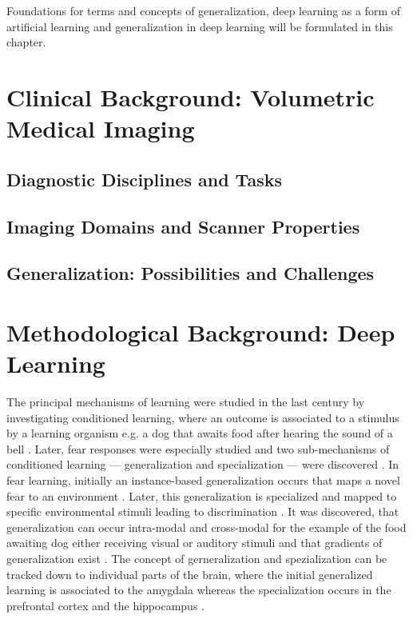 Foundations for terms and concepts of generalization, deep learning as a form of artificial learning and generalization in deep learning will be formulated in this chapter.

\section{Clinical Background: Volumetric Medical Imaging}
    \subsection{Diagnostic Disciplines and Tasks}
    \subsection{Imaging Domains and Scanner Properties}
    \subsection{Generalization: Possibilities and Challenges}

\section{Methodological Background: Deep Learning}

    The principal mechanisms of learning were studied in the last century by investigating conditioned learning, where an outcome is associated to a stimulus by a learning organism e.g. a dog that awaits food after hearing the sound of a bell \citep{pavlov1928conditioned, pavlov2010conditioned, banich2011generalization}. Later, fear responses were especially studied and two sub-mechanisms of conditioned learning --- generalization and specialization --- were discovered \citep{banich2011generalization}.
    In fear learning, initially an instance-based generalization occurs that maps a novel fear to an environment \citep{banich2011generalization}. Later, this generalization is specialized and mapped to specific environmental stimuli leading to discrimination \citep{banich2011generalization}.
    It was discovered, that generalization can occur intra-modal and cross-modal for the example of the food awaiting dog either receiving visual or auditory stimuli \citep{pavlov1928conditioned} and that gradients of generalization exist \citep{guttman1956discriminability}.
    The concept of gerneralization and spezialization can be tracked down to individual parts of the brain, where the initial generalized learning is associated to the amygdala whereas the specialization occurs in the prefrontal cortex and the hippocampus \citep{banich2011generalization}.

